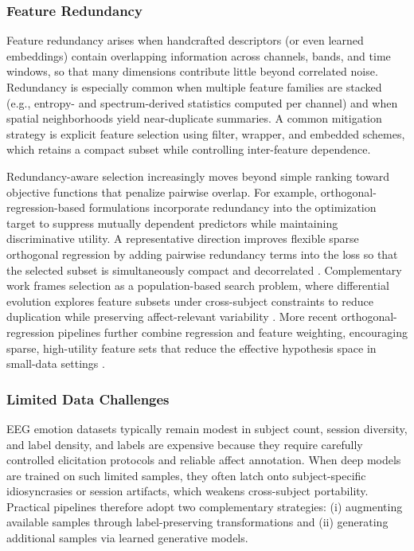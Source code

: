 \documentclass{WileyMSP-template}
\begin{document}
\subsubsection{Feature Redundancy}
Feature redundancy arises when handcrafted descriptors (or even learned embeddings) contain overlapping information across channels, bands, and time windows, so that many dimensions contribute little beyond correlated noise. Redundancy is especially common when multiple feature families are stacked (e.g., entropy- and spectrum-derived statistics computed per channel) and when spatial neighborhoods yield near-duplicate summaries. A common mitigation strategy is explicit feature selection using filter, wrapper, and embedded schemes, which retains a compact subset while controlling inter-feature dependence.

Redundancy-aware selection increasingly moves beyond simple ranking toward objective functions that penalize pairwise overlap. For example, orthogonal-regression-based formulations incorporate redundancy into the optimization target to suppress mutually dependent predictors while maintaining discriminative utility. A representative direction improves flexible sparse orthogonal regression by adding pairwise redundancy terms into the loss so that the selected subset is simultaneously compact and decorrelated \cite{xu2021_pairwise_redundancy}. Complementary work frames selection as a population-based search problem, where differential evolution explores feature subsets under cross-subject constraints to reduce duplication while preserving affect-relevant variability \cite{kannadasan2023_de_eeg}. More recent orthogonal-regression pipelines further combine regression and feature weighting, encouraging sparse, high-utility feature sets that reduce the effective hypothesis space in small-data settings \cite{xu2023_fsor_weighting}.

\subsubsection{Limited Data Challenges}
EEG emotion datasets typically remain modest in subject count, session diversity, and label density, and labels are expensive because they require carefully controlled elicitation protocols and reliable affect annotation. When deep models are trained on such limited samples, they often latch onto subject-specific idiosyncrasies or session artifacts, which weakens cross-subject portability. Practical pipelines therefore adopt two complementary strategies: (i) augmenting available samples through label-preserving transformations and (ii) generating additional samples via learned generative models.
\end{document}
